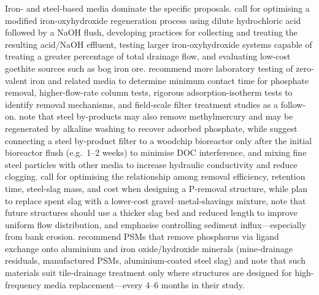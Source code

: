 \documentclass[11pt]{article}
\begin{document}
Iron- and steel-based media dominate the specific proposals. \textcite{Allred2017} call for optimising a modified iron-oxyhydroxide regeneration process using dilute hydrochloric acid followed by a NaOH flush, developing practices for collecting and treating the resulting acid/NaOH effluent, testing larger iron-oxyhydroxide systems capable of treating a greater percentage of total drainage flow, and evaluating low-cost goethite sources such as bog iron ore. \textcite{Allred2014} recommend more laboratory testing of zero-valent iron and related media to determine minimum contact time for phosphate removal, higher-flow-rate column tests, rigorous adsorption-isotherm tests to identify removal mechanisms, and field-scale filter treatment studies as a follow-on. \textcite{Hua2016} note that steel by-products may also remove methylmercury and may be regenerated by alkaline washing to recover adsorbed phosphate, while \textcite{Sellner2019b} suggest connecting a steel by-product filter to a woodchip bioreactor only after the initial bioreactor flush (e.g.\ 1--2 weeks) to minimise DOC interference, and mixing fine steel particles with other media to increase hydraulic conductivity and reduce clogging. \textcite{Wang2020d} call for optimising the relationship among removal efficiency, retention time, steel-slag mass, and cost when designing a P-removal structure, while \textcite{Shedekar2020} plan to replace spent slag with a lower-cost gravel--metal-shavings mixture, note that future structures should use a thicker slag bed and reduced length to improve uniform flow distribution, and emphasise controlling sediment influx---especially from bank erosion. \textcite{Penn2020} recommend PSMs that remove phosphorus via ligand exchange onto aluminium and iron oxide/hydroxide minerals (mine-drainage residuals, manufactured PSMs, aluminium-coated steel slag) and note that such materials suit tile-drainage treatment only where structures are designed for high-frequency media replacement---every 4--6 months in their study.
\end{document}
